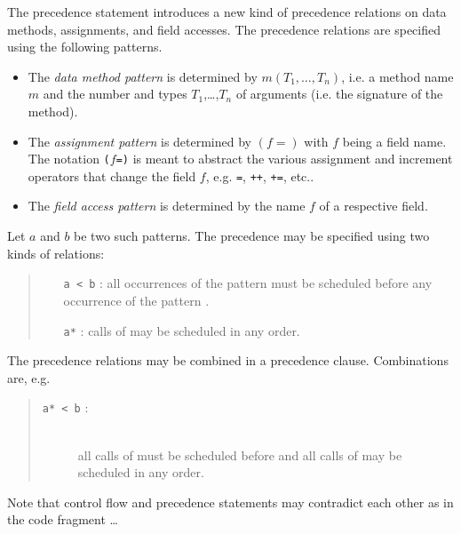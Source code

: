 The precedence statement introduces a new kind of precedence relations 
on data methods, assignments, and field accesses. The precedence
relations are specified using the following patterns.
\begin{itemize}
   \item The \emph{data method pattern} is determined by
   $m(T_{1},\ldots,T_{n})$, i.e. a method name $m$ and the number and types 
   $T_{1}$,\ldots,$T_{n}$ of arguments (i.e. the signature of the method).
   
   \item The \emph{assignment pattern} is determined by 
   $(f=)$ with $f$ being a field name. The notation \texttt{($f$=)} is
    meant to abstract the various assignment and increment operators that
    change the field $f$, 
   e.g. \texttt{=}, \texttt{++}, \texttt{+=}, etc.. 
   
   \item The \emph{field access pattern} is determined by the name $f$ of a
   respective field.
\end{itemize}
Let $a$ and $b$ be two such patterns. The precedence may be specified 
using two kinds of relations: 
\begin{quote}
    \begin{enumerate}
	\item[\texttt{a < b} :] all occurrences of the pattern 
	must be scheduled before any occurrence of the pattern .
                    
	\item[\texttt{a*} :] calls of  may be scheduled in
	any order.

    \end{enumerate}
\end{quote}
The precedence relations may be combined in a precedence clause. 
Combinations are, e.g. 
\begin{quote}
  \begin{description}

	\item[\texttt{a* < b} :]\ \\
	 all calls of  must be scheduled
	before  and all calls of  may be scheduled in any
	order.
    
  \end{description}
\end{quote}

Note that control flow and precedence statements may contradict each
other as in the code fragment
%
\BEP
\ldots

